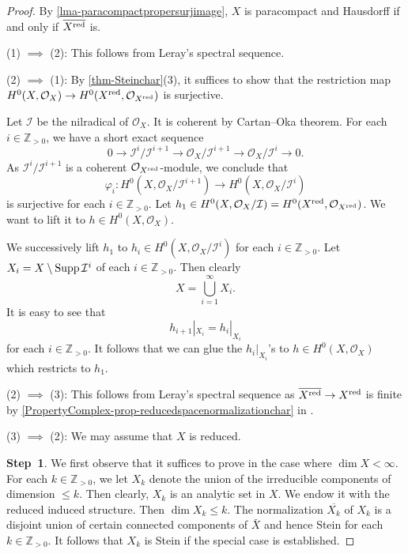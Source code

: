 \begin{proof}
    By \cref{lma-paracompactpropersurjimage}, $X$ is paracompact and Hausdorff if and only if $\overline{X^{\operatorname{red}}}$ is.

    (1) $\implies$ (2): This follows from Leray's spectral sequence.

    (2) $\implies$ (1): By \cref{thm-Steinchar}(3), it suffices to show that the restriction map $H^0(X,\mathcal{O}_X)\rightarrow H^0(X^{\operatorname{red}},\mathcal{O}_{X^{\operatorname{red}}})$ is surjective.

    Let $\mathcal{I}$ be the nilradical of $\mathcal{O}_X$. It is coherent by Cartan--Oka theorem.  For each $i\in \mathbb{Z}_{>0}$, we have a short exact sequence
    \[
        0\rightarrow \mathcal{I}^i/\mathcal{I}^{i+1}\rightarrow \mathcal{O}_X/\mathcal{I}^{i+1}\rightarrow \mathcal{O}_X/\mathcal{I}^{i}\rightarrow 0.
    \]
    As $\mathcal{I}^i/\mathcal{I}^{i+1}$ is a coherent $\mathcal{O}_{X^{\operatorname{red}}}$-module, we conclude that 
    \[
        \varphi_i: H^0(X,\mathcal{O}_X/\mathcal{I}^{i+1})\rightarrow H^0(X,\mathcal{O}_X/\mathcal{I}^{i})  
    \]
    is surjective for each  $i\in \mathbb{Z}_{>0}$. Let $h_1\in H^0(X,\mathcal{O}_X/\mathcal{I})=H^0(X^{\operatorname{red}},\mathcal{O}_{X^{\operatorname{red}}})$. We want to lift it to $h\in H^0(X,\mathcal{O}_X)$.

    We successively lift $h_1$ to $h_i\in H^0(X,\mathcal{O}_X/\mathcal{I}^i)$ for each $i\in \mathbb{Z}_{>0}$. Let $X_i=X\setminus \operatorname{Supp} \mathcal{I}^i$ of each $i\in \mathbb{Z}_{>0}$. Then clearly
    \[
        X=\bigcup_{i=1}^{\infty}X_i.  
    \] 
    It is easy to see that 
    \[
        h_{i+1}|_{X_i}=h_i|_{X_i}  
    \]
    for each $i\in \mathbb{Z}_{>0}$. It follows that we can glue the $h_i|_{X_i}$'s
    to $h\in H^0(X,\mathcal{O}_X)$ which restricts to $h_1$.

    (2) $\implies$ (3): This follows from Leray's spectral sequence as $\overline{X^{\operatorname{red}}}\rightarrow X^{\operatorname{red}}$ is finite by \cref{PropertyComplex-prop-reducedspacenormalizationchar} in .

    (3) $\implies$ (2): We may assume that $X$ is reduced. 
    
    \textbf{Step~1}.
    We first observe that it suffices to prove in the case where $\dim X<\infty$.
    For each $k\in \mathbb{Z}_{>0}$, we let $X_k$ denote the union of the irreducible components of dimension $\leq k$. Then clearly, $X_k$ is an analytic set in $X$. We endow it with the reduced induced structure. Then $\dim X_k\leq k$.
    The normalization $\overline{X_k}$ of $X_k$ is a disjoint union of certain connected components of $\bar{X}$ and hence Stein for each $k\in \mathbb{Z}_{>0}$. It follows that $X_k$ is Stein if the special case is established.


\end{proof}
